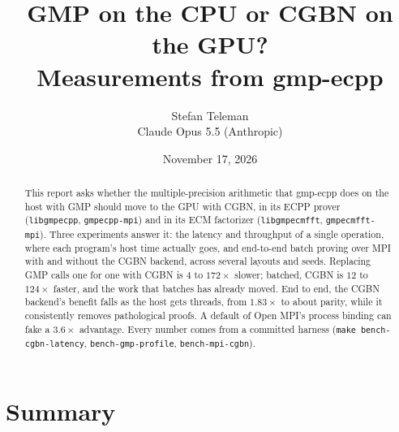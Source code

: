 \documentclass[11pt,a4paper]{article}
\title{GMP on the CPU or CGBN on the GPU?\\[4pt]
  \large Measurements from gmp-ecpp}
\author{Stefan Teleman \code{<stefan.teleman@gmail.com>}\\[4pt]Claude Opus 5.5 (Anthropic)}
\date{November 17, 2026}
\newcommand{\code}[1]{\texttt{#1}}
\begin{document}
\maketitle

\begin{abstract}
This report asks whether the multiple-precision arithmetic that gmp-ecpp
does on the host with GMP should move to the GPU with CGBN, in its ECPP
prover (\code{libgmpecpp}, \code{gmpecpp-mpi}) and in its ECM factorizer
(\code{libgmpecmfft}, \code{gmpecmfft-mpi}). Three experiments answer it:
the latency and throughput of a single operation, where each program's
host time actually goes, and end-to-end batch proving over MPI with and
without the CGBN backend, across several layouts and seeds. Replacing GMP
calls one for one with CGBN is $4$ to $172\times$ slower; batched, CGBN is
$12$ to $124\times$ faster, and the work that batches has already moved.
End to end, the CGBN backend's benefit falls as the host gets threads,
from $1.83\times$ to about parity, while it consistently removes
pathological proofs. A default of Open MPI's process binding can fake a
$3.6\times$ advantage. Every number comes from a committed harness
(\code{make bench-cgbn-latency}, \code{bench-gmp-profile},
\code{bench-mpi-cgbn}).
\end{abstract}

\tableofcontents

\section{Summary}
\end{document}
